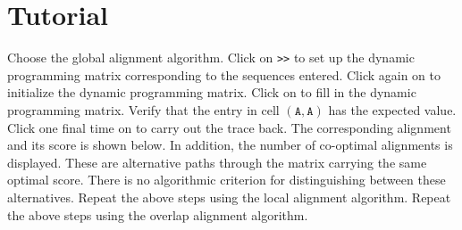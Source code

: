 \section{Tutorial}
\begin{enumerate}
  \I Choose the global alignment algorithm.
  \I Click on \texttt{>>} to set up the dynamic programming matrix
  corresponding to the sequences entered.
  \I Click again on \ty{>>} to initialize the dynamic programming
  matrix.
  \I Click on \ty{>>} to fill in the dynamic programming
  matrix. Verify that the entry in cell $(\mathtt{A},\mathtt{A})$ has the expected
  value. 
  \I Click one final time on \ty{>>} to carry out the trace back. The
  corresponding alignment and its score is shown below. In addition,
  the number of co-optimal alignments is displayed. These are
  alternative paths through the matrix carrying the same optimal
  score. There is no algorithmic criterion for distinguishing between
  these alternatives.
  \I Repeat the above steps using the local alignment algorithm.
  \I Repeat the above steps using the overlap alignment algorithm.
\end{enumerate}





